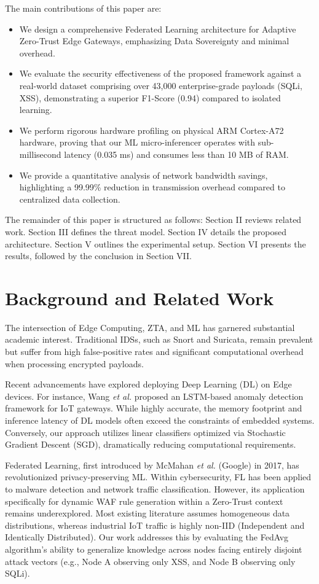 \documentclass[conference]{IEEEtran}
\begin{document}
The main contributions of this paper are:
\begin{itemize}
    \item We design a comprehensive Federated Learning architecture for Adaptive Zero-Trust Edge Gateways, emphasizing Data Sovereignty and minimal overhead.
    \item We evaluate the security effectiveness of the proposed framework against a real-world dataset comprising over 43,000 enterprise-grade payloads (SQLi, XSS), demonstrating a superior F1-Score (0.94) compared to isolated learning.
    \item We perform rigorous hardware profiling on physical ARM Cortex-A72 hardware, proving that our ML micro-inferencer operates with sub-millisecond latency (0.035 ms) and consumes less than 10 MB of RAM.
    \item We provide a quantitative analysis of network bandwidth savings, highlighting a 99.99\% reduction in transmission overhead compared to centralized data collection.
\end{itemize}

The remainder of this paper is structured as follows: Section II reviews related work. Section III defines the threat model. Section IV details the proposed architecture. Section V outlines the experimental setup. Section VI presents the results, followed by the conclusion in Section VII.

\section{Background and Related Work}
The intersection of Edge Computing, ZTA, and ML has garnered substantial academic interest. Traditional IDSs, such as Snort and Suricata, remain prevalent but suffer from high false-positive rates and significant computational overhead when processing encrypted payloads. 

Recent advancements have explored deploying Deep Learning (DL) on Edge devices. For instance, Wang \textit{et al.} proposed an LSTM-based anomaly detection framework for IoT gateways. While highly accurate, the memory footprint and inference latency of DL models often exceed the constraints of embedded systems. Conversely, our approach utilizes linear classifiers optimized via Stochastic Gradient Descent (SGD), dramatically reducing computational requirements.

Federated Learning, first introduced by McMahan \textit{et al.} (Google) in 2017, has revolutionized privacy-preserving ML. Within cybersecurity, FL has been applied to malware detection and network traffic classification. However, its application specifically for dynamic WAF rule generation within a Zero-Trust context remains underexplored. Most existing literature assumes homogeneous data distributions, whereas industrial IoT traffic is highly non-IID (Independent and Identically Distributed). Our work addresses this by evaluating the FedAvg algorithm's ability to generalize knowledge across nodes facing entirely disjoint attack vectors (e.g., Node A observing only XSS, and Node B observing only SQLi).
\end{document}

